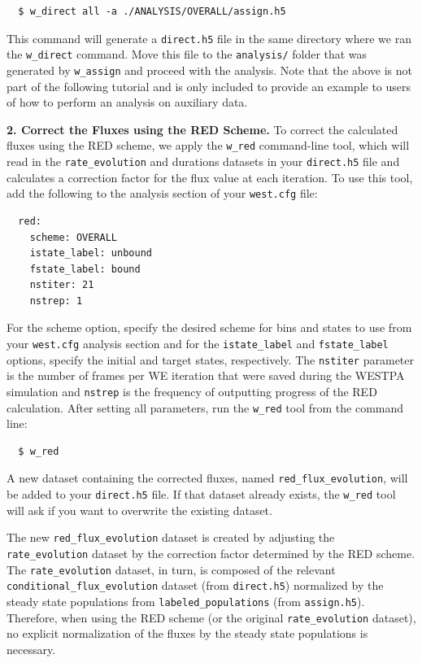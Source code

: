 \begin{verbatim}
  $ w_direct all -a ./ANALYSIS/OVERALL/assign.h5
\end{verbatim}

This command will generate a \verb|direct.h5| file in the same directory where we ran the \verb|w_direct| command.
Move this file to the \verb|analysis/| folder that was generated by \verb|w_assign| and proceed with the analysis.
Note that the above is not part of the following tutorial and is only included to provide an example to users of how to perform an analysis on auxiliary data.

\textbf{2. Correct the Fluxes using the RED Scheme.} To correct the calculated fluxes using the RED scheme, we apply the \verb|w_red| command-line tool, which will read in the \verb|rate_evolution| and durations datasets in your \verb|direct.h5| file and calculates a correction factor for the flux value at each iteration.
To use this tool, add the following to the analysis section of your \verb|west.cfg| file:

\begin{verbatim}
  red:
    scheme: OVERALL
    istate_label: unbound
    fstate_label: bound
    nstiter: 21
    nstrep: 1
\end{verbatim}

\noindent For the scheme option, specify  the desired scheme for bins and states to use from your \verb|west.cfg| analysis section and for the \verb|istate_label| and \verb|fstate_label| options, specify the initial and target states, respectively.
The \verb|nstiter| parameter is the number of frames per WE iteration that were saved during the WESTPA simulation and \verb|nstrep| is the frequency of outputting progress of the RED calculation. After setting all parameters, run the \verb|w_red| tool from the command line:

\begin{verbatim}
  $ w_red
\end{verbatim}

\noindent A new dataset containing the corrected fluxes, named \verb|red_flux_evolution|, will be added to your \verb|direct.h5| file.
If that dataset already exists, the \verb|w_red| tool will ask if you want to overwrite the existing dataset.

The new \verb|red_flux_evolution| dataset is created by adjusting the \verb|rate_evolution| dataset by the correction factor determined by the RED scheme.
The \verb|rate_evolution| dataset, in turn, is composed of the relevant \verb|conditional_flux_evolution| dataset (from \verb|direct.h5|) normalized by the steady state populations from \verb|labeled_populations| (from \verb|assign.h5|).
Therefore, when using the RED scheme (or the original \verb|rate_evolution| dataset), no explicit normalization of the fluxes by the steady state populations is necessary.

